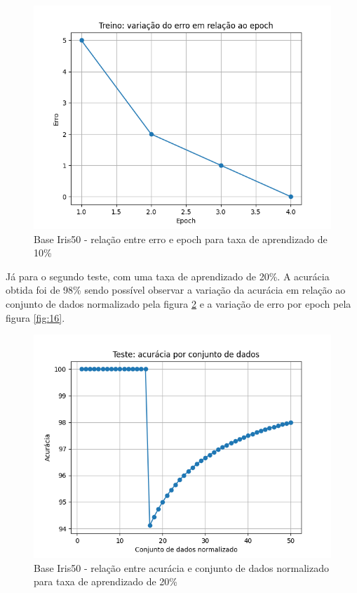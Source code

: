 \documentclass[12pt, %
openright, 
oneside, %
a4paper,    %
brazil]{facom-ufu-abntex2}
\begin{document}
\begin{figure}[H]
\centering
\includegraphics[scale=0.9]{figuras/erro_7.png}
\caption{Base Iris50 - relação entre erro e epoch para taxa de aprendizado de 10\%}
\label{fig:14}
\end{figure}

Já para o segundo teste, com uma taxa de aprendizado de 20\%. A acurácia obtida foi de 98\% sendo possível observar a variação da acurácia em relação ao conjunto de dados normalizado pela figura \ref{fig:15} e a variação de erro por epoch pela figura \ref{fig:16}.

\begin{figure}[H]
\centering
\includegraphics[scale=0.9]{figuras/acuracia_8.png}
\caption{Base Iris50 - relação entre acurácia e conjunto de dados normalizado para taxa de aprendizado de 20\%}
\label{fig:15}
\end{figure}
\end{document}
